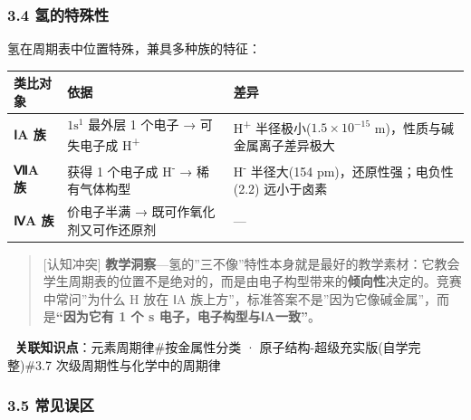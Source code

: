 \subsubsection{3.4 氢的特殊性}\label{ux6c22ux7684ux7279ux6b8aux6027}

氢在周期表中位置特殊，兼具多种族的特征：

{\def\LTcaptype{none} %
\begin{longtable}[]{@{}
  >{\raggedright\arraybackslash}p{}
  >{\raggedright\arraybackslash}p{}
  >{\raggedright\arraybackslash}p{}@{}}
\toprule\noalign{}
\begin{minipage}[b]{\linewidth}\raggedright
类比对象
\end{minipage} & \begin{minipage}[b]{\linewidth}\raggedright
依据
\end{minipage} & \begin{minipage}[b]{\linewidth}\raggedright
差异
\end{minipage} \\
\midrule\noalign{}
\endhead
\bottomrule\noalign{}
\endlastfoot
\textbf{ⅠA 族} & \(1\mathrm{s}^1\) 最外层 1 个电子 → 可失电子成 H\textsuperscript{+} & H\textsuperscript{+} 半径极小(\(1.5\times10^{-15}\) m)，性质与碱金属离子差异极大 \\
\textbf{ⅦA 族} & 获得 1 个电子成 H\textsuperscript{-} → 稀有气体构型 & H\textsuperscript{-} 半径大(154 pm)，还原性强；电负性(2.2) 远小于卤素 \\
\textbf{ⅣA 族} & 价电子半满 → 既可作氧化剂又可作还原剂 & --- \\
\end{longtable}
}

\begin{quote}
{[}认知冲突{]} \textbf{教学洞察}---氢的''三不像''特性本身就是最好的教学素材：它教会学生周期表的位置不是绝对的，而是由电子构型带来的\textbf{倾向性}决定的。竞赛中常问''为什么 H 放在 ⅠA 族上方''，标准答案不是''因为它像碱金属''，而是\textbf{``因为它有 1 个 s 电子，电子构型与ⅠA一致''}。
\end{quote}

🔗 \textbf{关联知识点}：元素周期律\#按金属性分类 · 原子结构-超级充实版(自学完整)\#3.7 次级周期性与化学中的周期律

\subsubsection{3.5 常见误区}\label{ux5e38ux89c1ux8befux533a}

